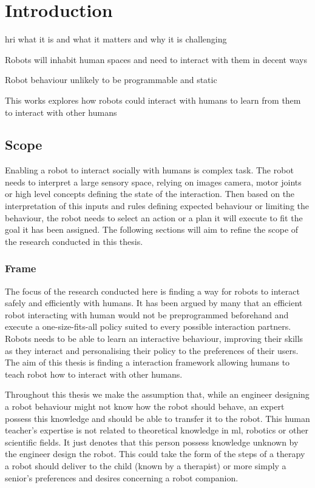 \chapter{Introduction} \label{chap:intro}
\graphicspath{{images/intro/}}

\gls{hri} what it is and what it matters and why it is challenging

Robots will inhabit human spaces and need to interact with them in decent ways

Robot behaviour unlikely to be programmable and static

This works explores how robots could interact with humans to learn from them to interact with other humans

\section{Scope}\label{sec:intro-scope}

Enabling a robot to interact socially with humans is complex task. The robot needs to interpret a large sensory space, relying on images camera, motor joints or high level concepts defining the state of the interaction. Then based on the interpretation of this inputs and rules defining expected behaviour or limiting the behaviour, the robot needs to select an action or a plan it will execute to fit the goal it has been assigned. The following sections will aim to refine the scope of the research conducted in this thesis.

\subsection{Frame}

The focus of the research conducted here is finding a way for robots to interact safely and efficiently with humans. It has been argued by many \citep{dautenhahn2004robots,billard2008robot} that an efficient robot interacting with human would not be preprogrammed beforehand and execute a one-size-fits-all policy suited to every possible interaction partners. Robots needs to be able to learn an interactive behaviour, improving their skills as they interact and personalising their policy to the preferences of their users. The aim of this thesis is finding a interaction framework allowing humans to teach robot how to interact with other humans.  

Throughout this thesis we make the assumption that, while an engineer designing a robot behaviour might not know how the robot should behave, an expert possess this knowledge and should be able to transfer it to the robot. This human teacher's expertise is not related to theoretical knowledge in \gls{ml}, robotics or other scientific fields. It just denotes that this person possess knowledge unknown by the engineer design the robot. This could take the form of the steps of a therapy a robot should deliver to the child (known by a therapist) or more simply a senior's preferences and desires concerning a robot companion.

